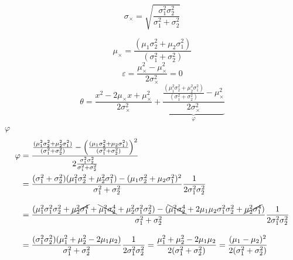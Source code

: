 \documentclass[a4paper,11pt]{book}
\theoremstyle{definition}
\newif\ifen
\newif\ifes
\newcommand{\en}[1]{\ifen#1\fi}
\newcommand{\es}[1]{\ifes#1\fi}
\begin{document}
\es{Esta ecuaci\'on es cuadr\'atica en x, y por lo tanto es proporcional a una funci\'on de densidad gausiana con desv\'io}
\begin{equation}
\sigma_{\times} = \sqrt{\frac{\sigma_1^2\sigma_2^2}{\sigma_1^2+\sigma_2^2}}
\end{equation}
%
\en{and mean}
\es{y media}
\begin{equation}
 \mu_{\times} = \frac{(\mu_1\sigma_2^2 + \mu_2\sigma_1^2)}{(\sigma_1^2 + \sigma_2^2) }
\end{equation}
%
\en{Since a term $\varepsilon = 0$ can be added to complete the square in $\theta$, this proof is sufficient when no normalization is needed. }%
\es{Dado que un t\'ermino $\varepsilon = 0$ puede ser agregado para completar el cuadrado en $\theta$, esta prueba es suficiente cuando no se necesita una normalizaci\'on. }%
%
\begin{equation}
 \varepsilon = \frac{\mu_{\times}^2-\mu_{\times}^2}{2\sigma_{\times}^2} = 0
\end{equation}
%
\en{By adding this term to $\theta$ we obtain}
\begin{equation}
 \theta = \frac{x^2 - 2\mu_{\times}x + \mu_{\times}^2 }{2\sigma_{\times}^2} + \underbrace{\frac{ \frac{(\mu_1^2\sigma_2^2 + \mu_2^2\sigma_1^2)}{(\sigma_1^2 + \sigma_2^2) } - \mu_{\times}^2}{2\sigma_{\times}^2}}_{\varphi}
\end{equation}
%
\en{Reorganizing} $\varphi$
\begin{equation}
\begin{split}
\varphi & = \frac{\frac{(\mu_1^2\sigma_2^2 + \mu_2^2\sigma_1^2)}{(\sigma_1^2 + \sigma_2^2) } - \left(\frac{(\mu_1\sigma_2^2 + \mu_2\sigma_1^2)}{(\sigma_1^2 + \sigma_2^2) }\right)^2 }{2\frac{\sigma_1^2\sigma_2^2}{\sigma_1^2+\sigma_2^2}}  \\
& = \frac{(\sigma_1^2 + \sigma_2^2)(\mu_1^2\sigma_2^2 + \mu_2^2\sigma_1^2) - (\mu_1\sigma_2^2 + \mu_2\sigma_1^2)^2}{\sigma_1^2 + \sigma_2^2}\frac{1}{2\sigma_1^2\sigma_2^2} \\[0.3cm]
& = \frac{(\mu_1^2\sigma_1^2\sigma_2^2 + \cancel{\mu_2^2\sigma_1^4} + \bcancel{\mu_1^2\sigma_2^4} + \mu_2^2\sigma_1^2\sigma_2^2) - (\bcancel{\mu_1^2\sigma_2^4} + 2\mu_1\mu_2\sigma_1^2\sigma_2^2 + \cancel{\mu_2^2\sigma_1^4} )}{\sigma_1^2 + \sigma_2^2}  \frac{1}{2\sigma_1^2\sigma_2^2} \\[0.3cm]
& = \frac{(\sigma_1^2\sigma_2^2)(\mu_1^2 + \mu_2^2 - 2\mu_1\mu_2)}{\sigma_1^2 + \sigma_2^2}\frac{1}{2\sigma_1^2\sigma_2^2} = \frac{\mu_1^2 + \mu_2^2 - 2\mu_1\mu_2}{2(\sigma_1^2 + \sigma_2^2)} = \frac{(\mu_1 - \mu_2)^2}{2(\sigma_1^2 + \sigma_2^2)}
\end{split}
\end{equation}
\end{document}
